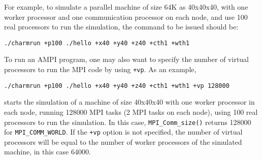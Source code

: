         For example, to simulate a parallel machine of size 64K as 40x40x40, with 
        one worker processor and one communication processor on each node, and use 100 
        real processors to run the simulation, the command to be issued should be:
\begin{verbatim}
./charmrun +p100 ./hello +x40 +y40 +z40 +cth1 +wth1
\end{verbatim}

        To run an AMPI program, one may also want to specify the number of virtual 
        processors to run the MPI code by using {\tt +vp}. As an example,
\begin{verbatim}
./charmrun +p100 ./hello +x40 +y40 +z40 +cth1 +wth1 +vp 128000
\end{verbatim}
        starts the simulation of a machine   of size 40x40x40 with one worker processor
        in each node, running 128000 MPI tasks (2 MPI tasks on each node),
         using 100 real processors to run the simulation. In this case, {\tt MPI\_Comm\_size()}
returns 128000 for {\tt MPI\_COMM\_WORLD}.
        If the {\tt +vp} option is not specified,
the number of virtual processors will be equal to the number of 
        worker processors of the simulated machine, in this case 64000.


